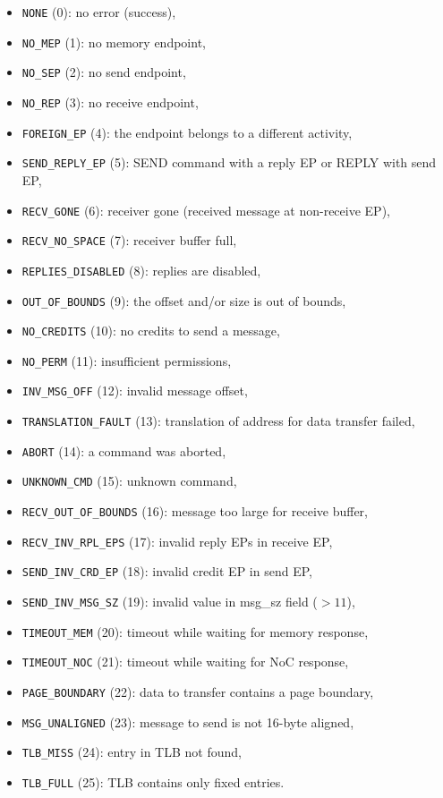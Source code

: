 \begin{itemize}
  \item \texttt{NONE} (0): no error (success),
  \item \texttt{NO\_MEP} (1): no memory endpoint,
  \item \texttt{NO\_SEP} (2): no send endpoint,
  \item \texttt{NO\_REP} (3): no receive endpoint,
  \item \texttt{FOREIGN\_EP} (4): the endpoint belongs to a different activity,
  \item \texttt{SEND\_REPLY\_EP} (5): SEND command with a reply EP or REPLY with send EP,
  \item \texttt{RECV\_GONE} (6): receiver gone (received message at non-receive EP),
  \item \texttt{RECV\_NO\_SPACE} (7): receiver buffer full,
  \item \texttt{REPLIES\_DISABLED} (8): replies are disabled,
  \item \texttt{OUT\_OF\_BOUNDS} (9): the offset and/or size is out of bounds,
  \item \texttt{NO\_CREDITS} (10): no credits to send a message,
  \item \texttt{NO\_PERM} (11): insufficient permissions,
  \item \texttt{INV\_MSG\_OFF} (12): invalid message offset,
  \item \texttt{TRANSLATION\_FAULT} (13): translation of address for data transfer failed,
  \item \texttt{ABORT} (14): a command was aborted,
  \item \texttt{UNKNOWN\_CMD} (15): unknown command,
  \item \texttt{RECV\_OUT\_OF\_BOUNDS} (16): message too large for receive buffer,
  \item \texttt{RECV\_INV\_RPL\_EPS} (17): invalid reply EPs in receive EP,
  \item \texttt{SEND\_INV\_CRD\_EP} (18): invalid credit EP in send EP,
  \item \texttt{SEND\_INV\_MSG\_SZ} (19): invalid value in msg\_sz field ($> 11$),
  \item \texttt{TIMEOUT\_MEM} (20): timeout while waiting for memory response,
  \item \texttt{TIMEOUT\_NOC} (21): timeout while waiting for NoC response,
  \item \texttt{PAGE\_BOUNDARY} (22): data to transfer contains a page boundary,
  \item \texttt{MSG\_UNALIGNED} (23): message to send is not 16-byte aligned,
  \item \texttt{TLB\_MISS} (24): entry in TLB not found,
  \item \texttt{TLB\_FULL} (25): TLB contains only fixed entries.
\end{itemize}

